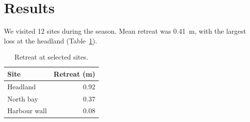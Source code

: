 \section{Results}
We visited 12 sites during the season. Mean retreat was 0.41~m, with the
largest loss at the headland (Table~\ref{tab:retreat}).

\begin{table}[h]
  \centering
  \begin{tabular}{lr}
    \toprule
    Site & Retreat (m) \\
    \midrule
    Headland & 0.92 \\
    North bay & 0.37 \\
    Harbour wall & 0.08 \\
    \bottomrule
  \end{tabular}
  \caption{Retreat at selected sites.}
  \label{tab:retreat}
\end{table}
